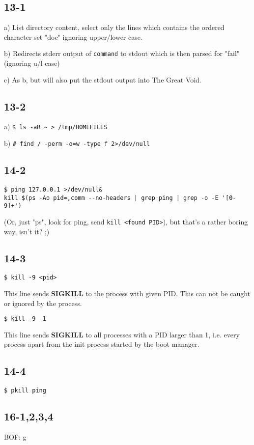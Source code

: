 \subsection{13-1}
a) List directory content, select only the lines which contains the ordered character set "doc" ignoring upper/lower case.

b) Redirects stderr output of \verb=command= to stdout which is then parsed for "fail" (ignoring u/l case)

c) As b, but will also put the stdout output into The Great Void.

\subsection{13-2}
a) \verb=$ ls -aR ~ > /tmp/HOMEFILES=

b) \verb?# find / -perm -o=w -type f 2>/dev/null?

\subsection{14-2}
\begin{verbatim}
$ ping 127.0.0.1 >/dev/null&
kill $(ps -Ao pid=,comm --no-headers | grep ping | grep -o -E '[0-9]+')
\end{verbatim}
(Or, just "ps", look for ping, send \verb=kill <found PID>=), but that's a rather boring way, isn't it? ;)

\subsection{14-3}
\verb=$ kill -9 <pid>=

This line sends \textbf{SIGKILL} to the process with given PID. This can not be caught or ignored by the process.

\verb=$ kill -9 -1=

This line sends \textbf{SIGKILL} to all processes with a PID larger than 1, i.e. every process apart from the init process started by the boot manager.

\subsection{14-4}
\verb=$ pkill ping=

\subsection{16-1,2,3,4}
BOF: g

